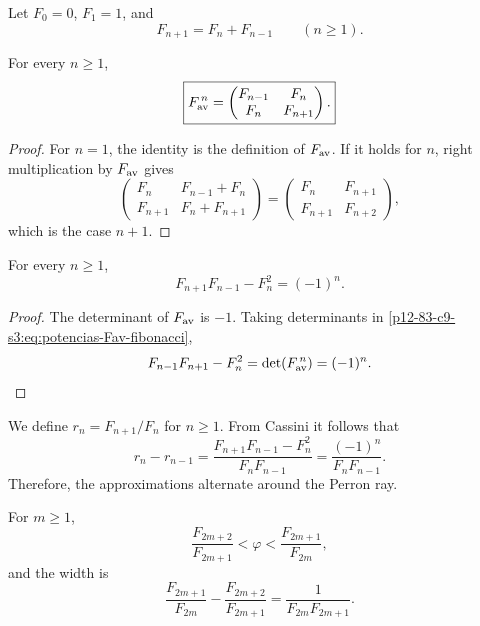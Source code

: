 Let \(F_0=0\), \(F_1=1\), and
\[
 F_{n+1}=F_n+F_{n-1}\qquad(n\geq1).
\]

\begin{theorem}
\label{p12-83-c9-s3:thm:potencias-fibonacci-phi}
For every \(n\geq1\),
\begin{equation}
 \boxed{
 F_{\rm av}^{\,n}=
 \begin{pmatrix}
 F_{n-1}&F_n\\
 F_n&F_{n+1}
 \end{pmatrix}.}
 \label{p12-83-c9-s3:eq:potencias-Fav-fibonacci}
\end{equation}
\end{theorem}

\begin{proof}
For \(n=1\), the identity is the definition of \(F_{\rm av}\). If it holds for \(n\), right multiplication by \(F_{\rm av}\) gives
\[
 \begin{pmatrix}
 F_n&F_{n-1}+F_n\\
 F_{n+1}&F_n+F_{n+1}
 \end{pmatrix}
 =
 \begin{pmatrix}
 F_n&F_{n+1}\\
 F_{n+1}&F_{n+2}
 \end{pmatrix},
\]
which is the case \(n+1\).
\end{proof}

\begin{theorem}
\label{p12-83-c9-s3:thm:cassini-phi}
For every \(n\geq1\),
\begin{equation}
 \boxed{F_{n+1}F_{n-1}-F_n^2=(-1)^n.}
 \label{p12-83-c9-s3:eq:cassini-phi}
\end{equation}
\end{theorem}

\begin{proof}
The determinant of \(F_{\rm av}\) is \(-1\). Taking determinants in
\eqref{p12-83-c9-s3:eq:potencias-Fav-fibonacci},
\[
 F_{n-1}F_{n+1}-F_n^2
 =\det(F_{\rm av}^{\,n})=(-1)^n.
\]
\end{proof}

We define \(r_n=F_{n+1}/F_n\) for \(n\geq1\). From Cassini it follows that
\[
 r_n-r_{n-1}
 =\frac{F_{n+1}F_{n-1}-F_n^2}{F_nF_{n-1}}
 =\frac{(-1)^n}{F_nF_{n-1}}.
\]
Therefore, the approximations alternate around the Perron ray.

\begin{proposition}
\label{p12-83-c9-s3:prop:horquillas-perron-phi}
For \(m\geq1\),
\begin{equation}
 \frac{F_{2m+2}}{F_{2m+1}}
 <\varphi<
 \frac{F_{2m+1}}{F_{2m}},
 \label{p12-83-c9-s3:eq:horquilla-fibonacci-phi}
\end{equation}
and the width is
\begin{equation}
 \boxed{
 \frac{F_{2m+1}}{F_{2m}}
 -\frac{F_{2m+2}}{F_{2m+1}}
 =\frac{1}{F_{2m}F_{2m+1}}.}
 \label{p12-83-c9-s3:eq:anchura-fibonacci-phi}
\end{equation}
\end{proposition}

